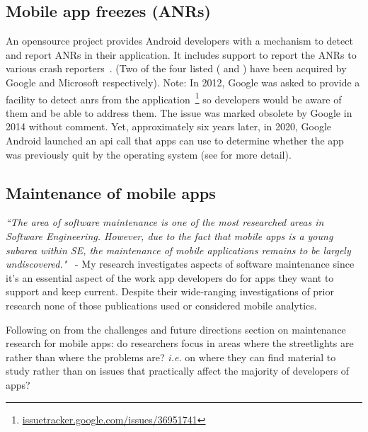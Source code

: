 \subsection{Mobile app freezes (ANRs)}
An opensource project provides Android developers with a mechanism to detect and report ANRs in their application. It includes support to report the ANRs to various crash reporters~. (Two of the four listed ( and ) have been acquired by Google and Microsoft respectively). Note: In 2012, Google was asked to provide a facility to detect \Glspl{anr} 
from the application~\footnote{\href{https://issuetracker.google.com/issues/36951741}{issuetracker.google.com/issues/36951741}} so developers would be aware of them and be able to address them. The issue was marked obsolete by Google in 2014 without comment. Yet, approximately six years later, in 2020, Google Android launched an \Gls{api} 
call that apps can use to determine whether the app was previously quit by the operating system (see  for more detail). 


\subsection{Maintenance of mobile apps}
\emph{``The area of software maintenance is one of the most researched areas in Software Engineering. However, due to the fact that mobile apps is a young subarea within SE, the maintenance of mobile applications remains to be largely undiscovered."}~ - My research investigates aspects of software maintenance since it's an essential aspect of the work app developers do for apps they want to support and keep current. Despite their wide-ranging investigations of prior research none of those publications used or considered mobile analytics. 

Following on from the challenges and future directions section on maintenance research for mobile apps: do researchers focus in areas where the streetlights are rather than where the problems are? \emph{i.e.} on where they can find material to study rather than on issues that practically affect the majority of developers of apps?


